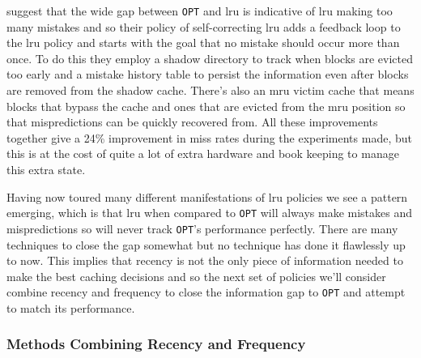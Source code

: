 \citet{kampeSelfCorrectingLRUReplacement2004} suggest that the wide gap between \texttt{OPT} and \gls{lru} is indicative of \gls{lru} making too many mistakes and so their policy of self-correcting \gls{lru} adds a feedback loop to the \gls{lru} policy and starts with the goal that no mistake should occur more than once. To do this they employ a shadow directory to track when blocks are evicted too early and a mistake history table to persist the information even after blocks are removed from the shadow cache. There's also an \gls{mru} victim cache that means blocks that bypass the cache and ones that are evicted from the \gls{mru} position so that mispredictions can be quickly recovered from. All these improvements together give a 24\% improvement in miss rates during the experiments made, but this is at the cost of quite a lot of extra hardware and book keeping to manage this extra state.

Having now toured many different manifestations of \gls{lru} policies we see a pattern emerging, which is that \gls{lru} when compared to \texttt{OPT} will always make mistakes and mispredictions so will never track \texttt{OPT}'s performance perfectly. There are many techniques to close the gap somewhat but no technique has done it flawlessly up to now. This implies that recency is not the only piece of information needed to make the best caching decisions and so the next set of policies we'll consider combine recency and frequency to close the information gap to \texttt{OPT} and attempt to match its performance.

\subsubsection{Methods Combining Recency and Frequency}

